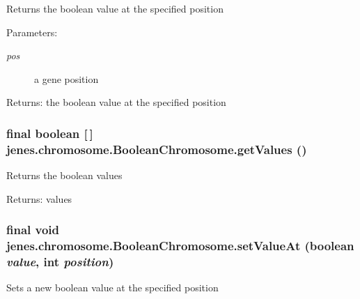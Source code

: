 Returns the boolean value at the specified position 

\begin{Desc}
\item[Parameters:]
\begin{description}
\item[{\em pos}]a gene position \end{description}
\end{Desc}
\begin{Desc}
\item[Returns:]the boolean value at the specified position \end{Desc}
\hypertarget{classjenes_1_1chromosome_1_1_boolean_chromosome_27db9ee77a97d896d0cdafc726681272}{
\subsubsection[getValues]{\setlength{\rightskip}{0pt plus 5cm}final boolean \mbox{[}$\,$\mbox{]} jenes.chromosome.BooleanChromosome.getValues ()}}
\label{classjenes_1_1chromosome_1_1_boolean_chromosome_27db9ee77a97d896d0cdafc726681272}


Returns the boolean values 

\begin{Desc}
\item[Returns:]values \end{Desc}
\hypertarget{classjenes_1_1chromosome_1_1_boolean_chromosome_9bd35e276f2739f19fa7a695c85f415c}{
\subsubsection[setValueAt]{\setlength{\rightskip}{0pt plus 5cm}final void jenes.chromosome.BooleanChromosome.setValueAt (boolean {\em value}, \/  int {\em position})}}
\label{classjenes_1_1chromosome_1_1_boolean_chromosome_9bd35e276f2739f19fa7a695c85f415c}


Sets a new boolean value at the specified position 

